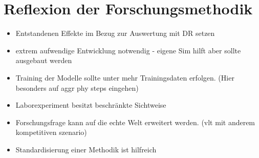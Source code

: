 \section{Reflexion der Forschungsmethodik}

\begin{itemize}
    \item Entstandenen Effekte im Bezug zur Auswertung mit DR setzen
    \item extrem aufwendige Entwicklung notwendig - eigene Sim hilft aber sollte ausgebaut werden
    \item Training der Modelle sollte unter mehr Trainingsdaten erfolgen. (Hier besonders auf aggr phy steps eingehen)
    \item Laborexperiment besitzt beschränkte Sichtweise
    \item Forschungsfrage kann auf die echte Welt erweitert werden. (vlt mit anderem kompetitiven szenario)
    \item Standardisierung einer Methodik ist hilfreich
\end{itemize}